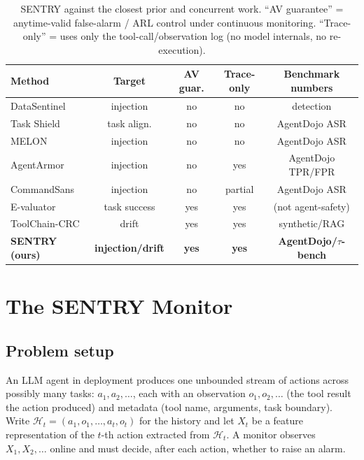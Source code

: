 \documentclass[10pt,journal,compsoc]{IEEEtran}
\newcommand{\botrule}{\bottomrule}
\theoremstyle{plain}
\theoremstyle{definition}
\newcommand{\Hcal}{\mathcal{H}}
\begin{document}
\begin{table}[t]
\centering
\caption{SENTRY against the closest prior and concurrent work.
``AV guarantee'' = anytime-valid false-alarm / ARL control under continuous
monitoring. ``Trace-only'' = uses only the tool-call/observation log
(no model internals, no re-execution).}\label{tab:related}
\begin{tabular}{@{}lcccc@{}}
\toprule
Method & Target & AV guar. & Trace-only & Benchmark numbers \\
\midrule
DataSentinel~\cite{liu2025datasentinel}     & injection & no  & no  & detection \\
Task Shield~\cite{jia2024taskshield}         & task align.& no  & no  & AgentDojo ASR \\
MELON~\cite{zhu2025melon}                    & injection & no  & no  & AgentDojo ASR \\
AgentArmor~\cite{wang2025agentarmor}         & injection & no  & yes & AgentDojo TPR/FPR \\
CommandSans~\cite{das2025commandsans}        & injection & no  & partial & AgentDojo ASR \\
E-valuator~\cite{sadhuka2025evaluator}       & task success& yes & yes & (not agent-safety) \\
ToolChain-CRC~\cite{opoku2026toolchain}      & drift     & yes & yes & synthetic/RAG \\
\textbf{SENTRY (ours)} & \textbf{injection/drift} & \textbf{yes} & \textbf{yes} & \textbf{AgentDojo/$\tau$-bench} \\
\botrule
\end{tabular}
\end{table}

\section{The SENTRY Monitor}\label{sec:method}

\subsection{Problem setup}\label{sec:setup}

An LLM agent in deployment produces one unbounded stream of actions across
possibly many tasks: \(a_1,a_2,\dots\), each with an observation
\(o_1,o_2,\dots\) (the tool result the action produced) and metadata (tool
name, arguments, task boundary). Write \(\Hcal_t=(a_1,o_1,\dots,a_t,o_t)\) for
the history and let \(X_t\) be a feature representation of the \(t\)-th action
extracted from \(\Hcal_t\). A monitor observes \(X_1,X_2,\dots\) online and
must decide, after each action, whether to raise an alarm.
\end{document}

